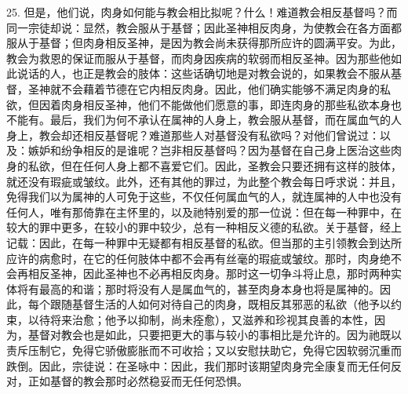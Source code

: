 25. 但是，他们说，肉身如何能与教会相比拟呢？什么！难道教会相反基督吗？而同一宗徒却说：显然，教会服从于基督；因此圣神相反肉身，为使教会在各方面都服从于基督；但肉身相反圣神，是因为教会尚未获得那所应许的圆满平安。为此，教会为救恩的保证而服从于基督，而肉身因疾病的软弱而相反圣神。因为那些他如此说话的人，也正是教会的肢体：这些话确切地是对教会说的，如果教会不服从基督，圣神就不会藉着节德在它内相反肉身。因此，他们确实能够不满足肉身的私欲，但因着肉身相反圣神，他们不能做他们愿意的事，即连肉身的那些私欲本身也不能有。最后，我们为何不承认在属神的人身上，教会服从基督，而在属血气的人身上，教会却还相反基督呢？难道那些人对基督没有私欲吗？对他们曾说过：以及：嫉妒和纷争相反的是谁呢？岂非相反基督吗？因为基督在自己身上医治这些肉身的私欲，但在任何人身上都不喜爱它们。因此，圣教会只要还拥有这样的肢体，就还没有瑕疵或皱纹。此外，还有其他的罪过，为此整个教会每日呼求说：并且，免得我们以为属神的人可免于这些，不仅任何属血气的人，就连属神的人中也没有任何人，唯有那倚靠在主怀里的，以及祂特别爱的那一位说：但在每一种罪中，在较大的罪中更多，在较小的罪中较少，总有一种相反义德的私欲。关于基督，经上记载：因此，在每一种罪中无疑都有相反基督的私欲。但当那的主引领教会到达所应许的病愈时，在它的任何肢体中都不会再有丝毫的瑕疵或皱纹。那时，肉身绝不会再相反圣神，因此圣神也不必再相反肉身。那时这一切争斗将止息，那时两种实体将有最高的和谐；那时将没有人是属血气的，甚至肉身本身也将是属神的。因此，每个跟随基督生活的人如何对待自己的肉身，既相反其邪恶的私欲（他予以约束，以待将来治愈；他予以抑制，尚未痊愈），又滋养和珍视其良善的本性，因为，基督对教会也是如此，只要把更大的事与较小的事相比是允许的。因为祂既以责斥压制它，免得它骄傲膨胀而不可收拾；又以安慰扶助它，免得它因软弱沉重而跌倒。因此，宗徒说：在圣咏中：因此，我们那时该期望肉身完全康复而无任何反对，正如基督的教会那时必然稳妥而无任何恐惧。\par


